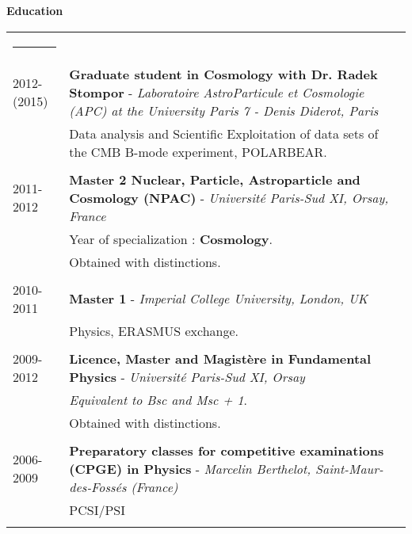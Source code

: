 \documentclass[a4paper,oneside]{article}
\newcommand{\ligne}[1]{\rule[0.5ex]{\textwidth}{#1}\\}
\newcommand{\interRubrique}{\bigskip}
\newcommand{\styleRub}[1]{\noindent\textbf{\large #1}\par}
\newcommand{\indentStd}{\noindent\hspace{\lenA}}
\newenvironment{rubrique}[2][\linewidth] {
    \styleRub{#2}
    \setlength{\lenB}{#1}
    \setlength{\lenC}{\linewidth}
    \addtolength{\lenC}{-\lenA}
    \addtolength{\lenC}{-\lenB}
    \addtolength{\lenC}{-\parindent}
    \addtolength{\lenC}{-9pt}
    \indentStd\begin{tabular}[t]{p{\lenB}p{\lenC}}
}
{\end{tabular}}
\newcommand{\lieu}[1]{\small{\textsl{#1}\ }}
\begin{document}
\begin{rubrique}[3.4cm]{Education}
\ligne{0.1mm}

2012-(2015)
& \textbf{Graduate student in Cosmology with Dr. Radek Stompor} - \lieu{Laboratoire AstroParticule et Cosmologie (APC) at the University Paris 7 - Denis Diderot, Paris} \\
& Data analysis and Scientific Exploitation of data sets of the CMB B-mode experiment, POLARBEAR. \\ \\

    2011-2012
& \textbf{Master 2 Nuclear, Particle, Astroparticle and Cosmology (NPAC)} - \lieu{Universit\'e Paris-Sud XI, Orsay, France}\\
& Year of specialization : \textbf{Cosmology}. \\ 
& Obtained with distinctions. \\ \\

 2010-2011
& \textbf{Master 1} - \lieu{Imperial College University, London, UK}\\
& Physics, ERASMUS exchange. \\ \\
    
2009-2012
& \textbf{Licence, Master and Magist\`ere in Fundamental Physics} - \lieu{Universit\'e Paris-Sud XI, Orsay}\\
& \textit{Equivalent to Bsc and Msc + 1}. \\
& Obtained with distinctions. \\ \\

2006-2009
& \textbf{Preparatory classes for competitive examinations (CPGE) in Physics} - \lieu{Marcelin Berthelot, Saint-Maur-des-Foss\'es (France)}\\
& PCSI/PSI \\ \\


\end{rubrique}

\interRubrique
\end{document}
